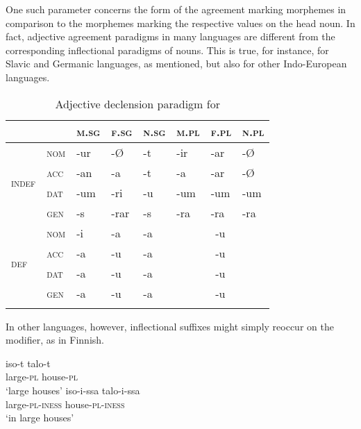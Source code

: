 One such parameter concerns the form of the agreement marking morphemes in comparison to the morphemes marking the respective values on the head noun. In fact, adjective agreement paradigms in many languages are different from the corresponding inflectional paradigms of nouns. This is true, for instance, for Slavic and Germanic languages, as mentioned, but also for other Indo-European languages. 
\begin{table}
\begin{tabular}{l l  l l l  l l l}
\lsptoprule
		&		&\textsc{m.sg}&\textsc{f.sg}&\textsc{n.sg}&\textsc{m.pl}&\textsc{f.pl}&\textsc{n.pl}\\
\midrule
		\multirow{4}{*}{\textsc{indef}} 	
		&\textsc{nom}	&-ur		&-Ø		&-t		&-ir		&-ar		&-Ø \\
		&\textsc{acc}	&-an		&-a		&-t		&-a		&-ar		&-Ø \\
		&\textsc{dat}	&-um	&-ri		&-u		&-um	&-um	&-um\\
		&\textsc{gen}	&-s		&-rar		&-s		&-ra		&-ra		&-ra\\
\midrule
		\multirow{4}{*}{\textsc{def}}	
		&\textsc{nom}	&-i		&-a		&-a		&\multicolumn{3}{c}{-u}\\
		&\textsc{acc}	&-a		&-u		&-a		&\multicolumn{3}{c}{-u}\\
		&\textsc{dat}	&-a		&-u		&-a		&\multicolumn{3}{c}{-u}\\
		&\textsc{gen}	&-a		&-u		&-a		&\multicolumn{3}{c}{-u}\\
\lspbottomrule
\end{tabular}
\caption[Adjective paradigm for \textsc{Icelandic}]{Adjective declension paradigm for }
\label{icelandic agr}
\end{table}
In other languages, however, inflectional suffixes might simply reoccur on the modifier, as in Finnish.
\begin{exe}
\ex 
{} \label{finnish agr.}
\begin{xlist}
\ex
\gll 	iso-t		talo-t\\
	large-\textsc{pl}	house-\textsc{pl}\\
\glt	‘large houses’
\ex
\gll 	iso-i-ssa		talo-i-ssa\\
	large-\textsc{pl}-\textsc{iness} house-\textsc{pl}-\textsc{iness}\\
\glt	‘in large houses’
\end{xlist}
\end{exe}
